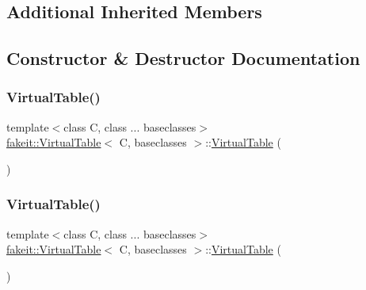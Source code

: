 \subsection*{Additional Inherited Members}


\subsection{Constructor \& Destructor Documentation}
\mbox{\label{structfakeit_1_1VirtualTable_ae64da18818c25b107d8f9f2c615c4c37}} 
\subsubsection{\texorpdfstring{VirtualTable()}{VirtualTable()}\hspace{0.1cm}{\footnotesize\ttfamily [1/10]}}
{\footnotesize\ttfamily template$<$class C, class ... baseclasses$>$ \\
\mbox{\hyperlink{structfakeit_1_1VirtualTable}{fakeit\+::\+Virtual\+Table}}$<$ C, baseclasses $>$\+::\mbox{\hyperlink{structfakeit_1_1VirtualTable}{Virtual\+Table}} (\begin{DoxyParamCaption}{ }\end{DoxyParamCaption})\hspace{0.3cm}{\ttfamily [inline]}}

\mbox{\label{structfakeit_1_1VirtualTable_ae64da18818c25b107d8f9f2c615c4c37}} 
\subsubsection{\texorpdfstring{VirtualTable()}{VirtualTable()}\hspace{0.1cm}{\footnotesize\ttfamily [2/10]}}
{\footnotesize\ttfamily template$<$class C, class ... baseclasses$>$ \\
\mbox{\hyperlink{structfakeit_1_1VirtualTable}{fakeit\+::\+Virtual\+Table}}$<$ C, baseclasses $>$\+::\mbox{\hyperlink{structfakeit_1_1VirtualTable}{Virtual\+Table}} (\begin{DoxyParamCaption}{ }\end{DoxyParamCaption})\hspace{0.3cm}{\ttfamily [inline]}}

